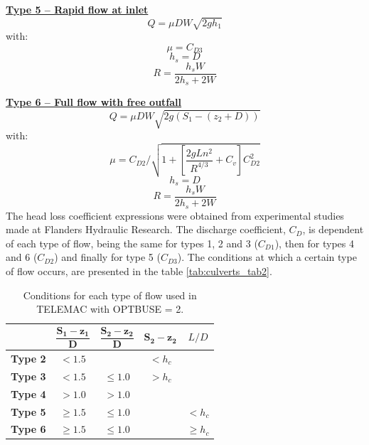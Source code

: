 \underline{\textbf{Type 5 -- Rapid flow at inlet}}\\
\begin{equation}
Q= \mu D W \sqrt{2gh_1}
\end{equation}
with:
\begin{equation}
\mu = C_{D3}
\end{equation}
\begin{equation}
h_s = D
\end{equation}
\begin{equation}
R = \dfrac{h_s W}{2h_s+2W}
\end{equation}

\underline{\textbf{Type 6 -- Full flow with free outfall}}\\
\begin{equation}
Q = \mu D W \sqrt{2g(S_1-(z_2+D))}
\end{equation}
with:
\begin{equation}
\mu = C_{D2}/\sqrt{1+\left[\dfrac{2gLn^2}{R^{4/3}} +C_v \right] C_{D2}^2}
\end{equation}
\begin{equation}
h_s=D
\end{equation}
\begin{equation}
R=\dfrac{h_s W}{2h_s+2W}
\end{equation}
The head loss coefficient expressions were obtained from experimental studies made at
Flanders Hydraulic Research.
The discharge coefficient, $C_D$, is dependent of each type of flow, being the same for
types 1, 2 and 3 ($C_{D1}$), then for types 4 and 6 ($C_{D2}$) and finally for type 5 ($C_{D3}$).
The conditions at which a certain type of flow occurs,
are presented in the table \ref{tab:culverts_tab2}.

\begin{table}[H]
\caption{Conditions for each type of flow used in TELEMAC with OPTBUSE = 2.}
\label{tab:culvert_tab2}
\begin{center}\begin{tabular}{|c|c|c|c|c|}
\hline
~ & $\mathbf{\dfrac{S_1-z_1}{D}}$ & $\mathbf{\dfrac{S_2-z_2}{D}}$ & $\mathbf{S_2-z_2}$ & $L/D$ \\
\hline
\textbf{Type 2} & $<1.5$    &  ~ & $< h_c$ & ~ \\
\hline
\textbf{Type 3} & $<1.5$    & $\le 1.0$ & $> h_c$ & ~\\
\hline
\textbf{Type 4} & $> 1.0$   & $> 1.0$ & ~ & ~\\
\hline
\textbf{Type 5} & $\ge 1.5$ & $\le 1.0$ & ~ & $< h_c$\\
\hline
\textbf{Type 6} & $\ge 1.5$ & $\le 1.0$  & ~ & $\ge h_c$\\
\hline
\end{tabular}\end{center}
\end{table}

